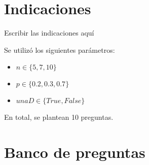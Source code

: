\documentclass[a4,11pt]{aleph-notas}
\begin{document}
\encabezado

\section{Indicaciones}

Escribir las indicaciones aquí



Se utilizó los siguientes parámetros:
\begin{itemize}
	\item $n \in \{5, 7, 10\}$
	\item $p \in \{0.2, 0.3, 0.7\}$
	\item $unaD \in \{True, False\}$

\end{itemize}
En total, se plantean 10 preguntas.


\section{Banco de preguntas}
\end{document}
